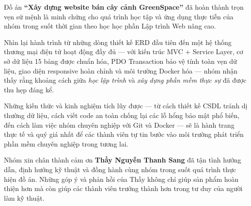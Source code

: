 \documentclass[11pt, a4paper]{article}
\begin{document}
Đồ án \textbf{``Xây dựng website bán cây cảnh GreenSpace''} đã hoàn thành
trọn vẹn sứ mệnh là minh chứng cho quá trình học tập và ứng dụng thực tiễn
của nhóm trong suốt thời gian theo học học phần Lập trình Web nâng cao.

Nhìn lại hành trình từ những dòng thiết kế ERD đầu tiên đến một hệ thống
thương mại điện tử hoạt động đầy đủ --- với kiến trúc MVC + Service Layer,
cơ sở dữ liệu 15 bảng được chuẩn hóa, PDO Transaction bảo vệ tính toàn vẹn
dữ liệu, giao diện responsive hoàn chỉnh và môi trường Docker hóa --- nhóm
nhận thấy rằng khoảng cách giữa \textit{học lập trình} và
\textit{xây dựng phần mềm thực sự} đã được thu hẹp đáng kể.

Những kiến thức và kinh nghiệm tích lũy được --- từ cách thiết kế CSDL
tránh dị thường dữ liệu, cách viết code an toàn chống lại các lỗ hổng bảo
mật phổ biến, đến cách làm việc nhóm chuyên nghiệp với Git và Docker ---
sẽ là hành trang thực tế và quý giá nhất để các thành viên tự tin bước
vào môi trường phát triển phần mềm chuyên nghiệp trong tương lai.

Nhóm xin chân thành cảm ơn \textbf{Thầy Nguyễn Thanh Sang} đã tận tình
hướng dẫn, định hướng kỹ thuật và đồng hành cùng nhóm trong suốt quá trình
thực hiện đồ án. Những góp ý và phản hồi của Thầy không chỉ giúp sản phẩm
hoàn thiện hơn mà còn giúp các thành viên trưởng thành hơn trong tư duy
của người làm kỹ thuật.
\end{document}
